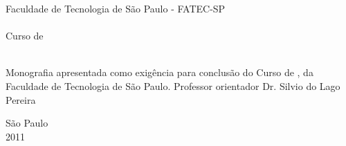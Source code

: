 \thispagestyle{empty}

\begin{center}
Faculdade de Tecnologia de São Paulo - FATEC-SP \\
\DTI \\
Curso de \PD \\
\vspace{2.5cm}
\TITLE
\vspace{2.5cm}
\large \BBC \\
\vspace{3cm}
\hspace{7cm} \begin{minipage}{0.5\textwidth}
Monografia apresentada como exigência para conclusão do Curso de \PD,
da Faculdade de Tecnologia de São Paulo. Professor
orientador Dr. Silvio do Lago Pereira
\end{minipage}
\vspace{4cm}

\large São Paulo \\ 2011
\end{center}
